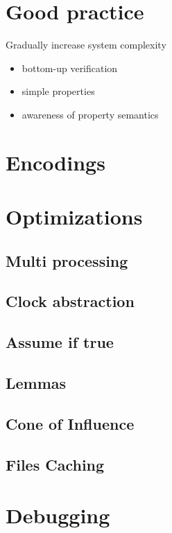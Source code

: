 \documentclass{article}
\theoremstyle{definition}
\begin{document}
\section{Good practice}

Gradually increase system complexity

\begin{itemize}
\item bottom-up verification
\item simple properties
\item awareness of property semantics
\end{itemize}


\section{Encodings}
\label{sec:encodings}


\section{Optimizations}
\label{sec:optimizations}

\subsection{Multi processing}

\subsection{Clock abstraction}

\subsection{Assume if true}

\subsection{Lemmas}

\subsection{Cone of Influence}

\subsection{Files Caching}


\section{Debugging}
\label{sec:debugging}

\newpage


\end{document}
